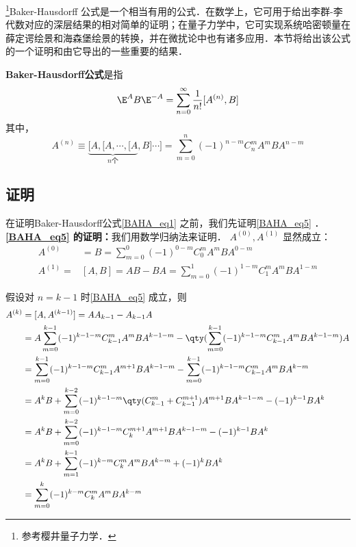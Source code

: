 \begin{issues}
\end{issues}


\footnote{参考樱井量子力学\cite{Sakurai}．}Baker-Hausdorff 公式是一个相当有用的公式．在数学上，它可用于给出李群-李代数对应的深层结果的相对简单的证明；在量子力学中，它可实现系统哈密顿量在薛定谔绘景和海森堡绘景的转换，并在微扰论中也有诸多应用．本节将给出该公式的一个证明和由它导出的一些重要的结果．

\textbf{Baker-Hausdorff公式}是指
\begin{equation}\label{BAHA_eq1}
\E ^{A}B\E^{-A}=\sum_{n=0}^{\infty}\frac{1}{n!}[A^{(n)},B]
\end{equation}
其中，
\begin{equation}\label{BAHA_eq5}
A^{(n)}\equiv\underbrace{[A,[A,\cdots,[A}_{n\text{个}},B]\cdots]
=\sum_{m=0}^{n}(-1)^{n-m}C_{n}^{m}A^mBA^{n-m}
\end{equation}

\subsection{证明}
在证明Baker-Hausdorff公式\autoref{BAHA_eq1} 之前，我们先证明\autoref{BAHA_eq5} ．\\

\textbf{\autoref{BAHA_eq5} 的证明：}我们用数学归纳法来证明．
$A^{(0)},A^{(1)}$ 显然成立：
\begin{equation}
\begin{aligned}
A^{(0)}&=B=\sum_{m=0}^{0}(-1)^{0-m}C_{0}^{m}A^mBA^{0-m}\\
A^{(1)}=&[A,B]=AB-BA=\sum_{m=0}^{1}(-1)^{1-m}C_{1}^{m}A^mBA^{1-m}
\end{aligned}
\end{equation}

假设对 $n=k-1$ 时\autoref{BAHA_eq5} 成立，则
\begin{equation}
\begin{aligned}
A^{(k)}&=[A,A^{(k-1)}]=AA_{k-1}-A_{k-1}A\\
&=A\sum_{m=0}^{k-1}(-1)^{k-1-m}C_{k-1}^{m}A^mBA^{k-1-m}-\qty(\sum_{m=0}^{k-1}(-1)^{k-1-m}C_{k-1}^{m}A^mBA^{k-1-m})A\\
&=\sum_{m=0}^{k-1}(-1)^{k-1-m}C_{k-1}^{m}A^{m+1}BA^{k-1-m}-\sum_{m=0}^{k-1}(-1)^{k-1-m}C_{k-1}^{m}A^mBA^{k-m}\\
&=A^{k}B+\sum_{m=0}^{k-2}(-1)^{k-1-m}\qty(C_{k-1}^{m}+C_{k-1}^{m+1})A^{m+1}BA^{k-1-m}-(-1)^{k-1}BA^k\\
&=A^{k}B+\sum_{m=0}^{k-2}(-1)^{k-1-m}C_{k}^{m+1}A^{m+1}BA^{k-1-m}-(-1)^{k-1}BA^k\\
&=A^{k}B+\sum_{m=1}^{k-1}(-1)^{k-m}C_{k}^{m}A^{m}BA^{k-m}+(-1)^{k}BA^k\\
&=\sum_{m=0}^{k}(-1)^{k-m}C_{k}^{m}A^{m}BA^{k-m}
\end{aligned}
\end{equation}

